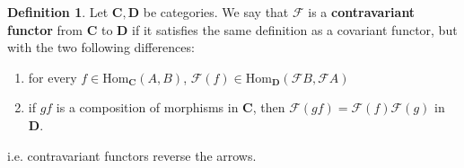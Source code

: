 \documentclass[12pt]{book}
\theoremstyle{definition}
\newtheorem{definition}[theorem]{Definition}
\begin{document}
\begin{definition}
    Let $\mathbf{C,D}$ be categories. We say that $\mathcal{F}$ is a \textbf{contravariant functor} from $\mathbf{C}$ to $\mathbf{D}$ if it satisfies the same definition as a covariant functor, but with the two following differences: 
    \begin{enumerate}
        \item for every $f \in \text{Hom}_\mathbf{C}(A,B)$, $\mathcal{F}(f) \in \text{Hom}_\mathbf{D}(\mathcal{F}B, \mathcal{F}A)$
        \item if $gf$ is a composition of morphisms in $\mathbf{C}$, then $\mathcal{F}(gf) = \mathcal{F}(f)\mathcal{F}(g)$ in $\mathbf{D}$. 
    \end{enumerate}
    i.e. contravariant functors reverse the arrows. 
\end{definition}
\end{document}
